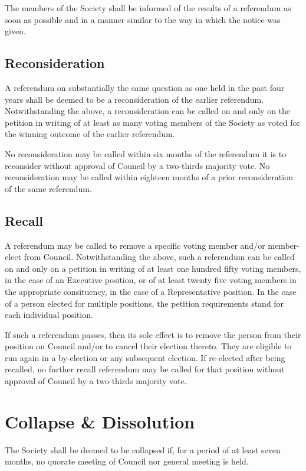 The members of the Society shall be informed of the results of a referendum as
soon as possible and in a manner similar to the way in which the notice was
given.

\subsection{Reconsideration}
A referendum on substantially the same question as one held in the past four
years shall be deemed to be a reconsideration of the earlier referendum.
Notwithstanding the above, a reconsideration can be called on and only on the
petition in writing of at least as many voting members of the Society as voted
for the winning outcome of the earlier referendum.

No reconsideration may be called within six months of the referendum it is to
reconsider without approval of Council by a two-thirds majority vote. No
reconsideration may be called within eighteen months of a prior reconsideration
of the same referendum.

\subsection{Recall}
A referendum may be called to remove a specific voting member and/or member-elect
from Council. Notwithstanding the above, such a referendum can be called on and
only on a petition in writing of at least one hundred fifty voting members, in
the case of an Executive position, or of at least twenty five voting members in
the appropriate consituency, in the case of a Representative position. In the
case of a person elected for multiple positions, the petition requirements stand
for each individual position.

If such a referendum passes, then its sole effect is to remove the person from
their position on Council and/or to cancel their election thereto. They are
eligible to run again in a by-election or any subsequent election. If re-elected
after being recalled, no further recall referendum may be called for that
position without approval of Council by a two-thirds majority vote.

\section{Collapse \& Dissolution}
The Society shall be deemed to be collapsed if, for a period of at least seven
months, no quorate meeting of Council nor general meeting is held.

